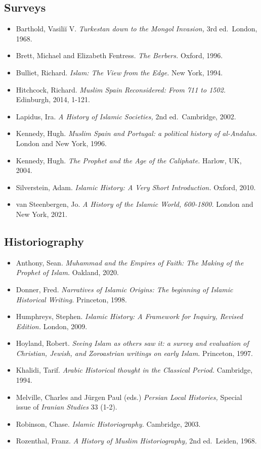 \documentclass[
]{book}
\providecommand{\tightlist}{%
  \setlength{\itemsep}{0pt}\setlength{\parskip}{0pt}}
\begin{document}
\hypertarget{surveys}{%
\subsection{Surveys}\label{surveys}}

\begin{itemize}
\tightlist
\item
  Barthold, Vasiliĭ V. \emph{Turkestan down to the Mongol Invasion,} 3rd ed.~London, 1968.
\item
  Brett, Michael and Elizabeth Fentress. \emph{The Berbers.} Oxford, 1996.
\item
  Bulliet, Richard. \emph{Islam: The View from the Edge.} New York, 1994.
\item
  Hitchcock, Richard. \emph{Muslim Spain Reconsidered: From 711 to 1502.} Edinburgh, 2014, 1-121.
\item
  Lapidus, Ira. \emph{A History of Islamic Societies,} 2nd ed.~Cambridge, 2002.
\item
  Kennedy, Hugh. \emph{Muslim Spain and Portugal: a political history of al-Andalus.} London and New York, 1996.
\item
  Kennedy, Hugh. \emph{The Prophet and the Age of the Caliphate.} Harlow, UK, 2004.
\item
  Silverstein, Adam. \emph{Islamic History: A Very Short Introduction.} Oxford, 2010.
\item
  van Steenbergen, Jo. \emph{A History of the Islamic World, 600-1800.} London and New York, 2021.
\end{itemize}

\hypertarget{historiography}{%
\subsection{Historiography}\label{historiography}}

\begin{itemize}
\tightlist
\item
  Anthony, Sean. \emph{Muhammad and the Empires of Faith: The Making of the Prophet of Islam.} Oakland, 2020.
\item
  Donner, Fred. \emph{Narratives of Islamic Origins: The beginning of Islamic Historical Writing.} Princeton, 1998.
\item
  Humphreys, Stephen. \emph{Islamic History: A Framework for Inquiry, Revised Edition.} London, 2009.
\item
  Hoyland, Robert. \emph{Seeing Islam as others saw it: a survey and evaluation of Christian, Jewish, and Zoroastrian writings on early Islam.} Princeton, 1997.
\item
  Khalidi, Tarif. \emph{Arabic Historical thought in the Classical Period.} Cambridge, 1994.
\item
  Melville, Charles and Jürgen Paul (eds.) \emph{Persian Local Histories,} Special issue of \emph{Iranian Studies} 33 (1-2).
\item
  Robinson, Chase. \emph{Islamic Historiography.} Cambridge, 2003.
\item
  Rozenthal, Franz. \emph{A History of Muslim Historiography,} 2nd ed.~Leiden, 1968.
\end{itemize}
\end{document}
